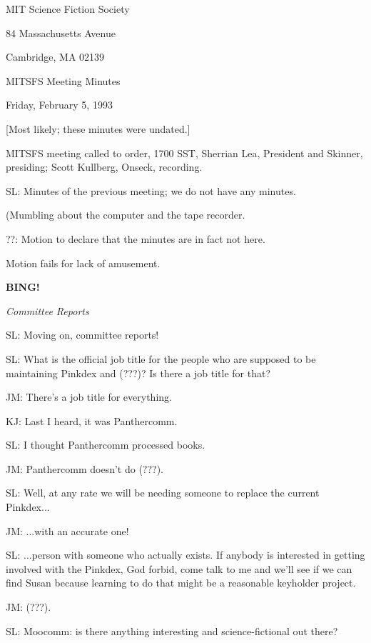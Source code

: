 \documentclass[12pt]{article}
\newcommand{\bing}{{\bf BING!} }
\newcommand{\goto}[1]{\bing \vskip 12pt \centerline{{\em{#1}}}}
\begin{document}
\begin{center}

MIT Science Fiction Society 

84 Massachusetts Avenue

Cambridge, MA 02139

\vspace{12pt}

MITSFS Meeting Minutes 

Friday, February 5, 1993

[Most likely; these minutes were undated.]

\end{center}
 
\vspace{18pt}

\setlength{\parskip}{6pt}

\noindent
MITSFS meeting called to order, 1700 SST,
Sherrian Lea, President and Skinner, presiding; Scott Kullberg, Onseck, recording.

SL: Minutes of the previous meeting; we do not have any minutes.

(Mumbling about the computer and the tape recorder.

??: Motion to declare that the minutes are in fact not here.

Motion fails for lack of amusement.

\goto{Committee Reports}

SL: Moving on, committee reports!

SL: What is the official job title for the people who are supposed to be maintaining Pinkdex and (???)? Is there a job title for that?

JM: There's a job title for everything.

KJ: Last I heard, it was Panthercomm.

SL: I thought Panthercomm processed books.

JM: Panthercomm doesn't do (???).

SL: Well, at any rate we will be needing someone to replace the current Pinkdex...

JM: ...with an accurate one!

SL: ...person with someone who actually exists. If anybody is interested in getting involved with the Pinkdex, God forbid, come talk to me and we'll see if we can find Susan because learning to do that might be a reasonable keyholder project.

JM: (???).

SL: Moocomm: is there anything interesting and science-fictional out there?
\end{document}
